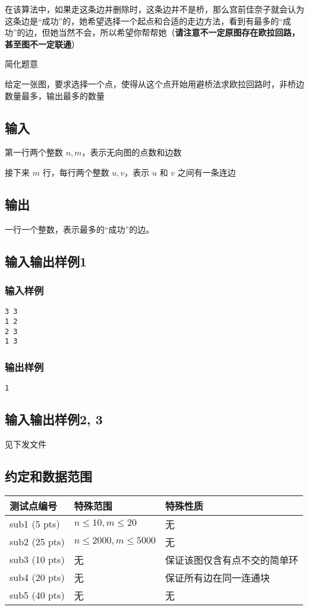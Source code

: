 \documentclass[UTF8]{ctexart}
\begin{document}
在该算法中，如果走这条边并删除时，这条边并不是桥，那么宫前佳奈子就会认为这条边是“成功”的，她希望选择一个起点和合适的走边方法，看到有最多的“成功”的边，但她当然不会，所以希望你帮帮她（\textbf{请注意不一定原图存在欧拉回路，甚至图不一定联通}）

\vspace{5mm}
简化题意

给定一张图，要求选择一个点，使得从这个点开始用避桥法求欧拉回路时，非桥边数量最多，输出最多的数量
\subsection{输入}
第一行两个整数 $n, m$，表示无向图的点数和边数

接下来 $m$ 行，每行两个整数 $u, v$，表示 $u$ 和 $v$ 之间有一条连边
\subsection{输出}
一行一个整数，表示最多的“成功”的边。
\subsection{输入输出样例1}
\subsubsection{输入样例}
\begin{verbatim}
3 3
1 2
2 3
1 3
\end{verbatim}
\subsubsection{输出样例}
\begin{verbatim}
1  
\end{verbatim}
\subsection{输入输出样例2, 3}
见下发文件

\subsection{约定和数据范围}

\begin{center}
\begin{tabular}{*{3}{|C{9em}}|}
\hline
    测试点编号 & 特殊范围 & 特殊性质 \\ \hline
    sub1 (5 pts) & $n\leq 10, m\leq 20$ & 无 \\ \hline
    sub2 (25 pts) & $n\leq 2000, m\leq 5000$ & 无  \\ \hline
    sub3 (10 pts) & 无 & 保证该图仅含有点不交的简单环 \\ \hline
    sub4 (20 pts) & 无 & 保证所有边在同一连通块 \\ \hline
    sub5 (40 pts) & 无 & 无 \\ \hline
\end{tabular}
\end{center}
\end{document}
